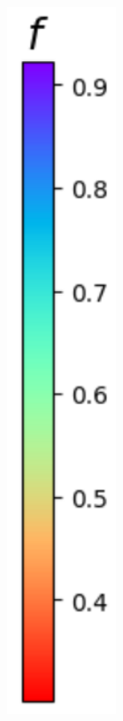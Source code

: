 \documentclass[varwidth, border=10pt]{standalone}
\begin{document}
\begin{figure}
\begin{subfigure}{0.9\textwidth}
\end{subfigure}%
\begin{subfigure}{0.1\textwidth}
\includegraphics[width=.8\columnwidth]{col-2.pdf} \\ [2ex]
\end{subfigure}
\end{figure}
\end{document}
